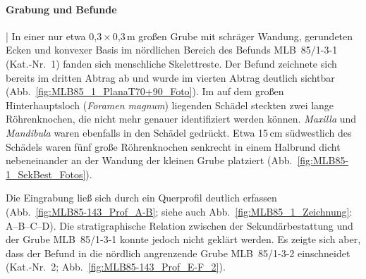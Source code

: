 \paragraph{Grabung und Befunde}\hspace{-.5em}|\hspace{.5em}%
In einer nur etwa 0,3\,$\times$\,0,3\,m großen Grube mit schräger Wandung, gerundeten Ecken und konvexer Basis im nördlichen Bereich des Befunds MLB~85/1-3-1 (Kat.-Nr.~1) fanden sich menschliche Skelettreste. Der Befund zeichnete sich bereits im dritten Abtrag ab und wurde im vierten Abtrag deutlich sichtbar (Abb.~\ref{fig:MLB85_1_PlanaT70+90_Foto}). Im auf dem großen Hinterhauptsloch (\textit{Foramen magnum}) liegenden Schädel steckten zwei lange Röhrenknochen, die nicht mehr genauer identifiziert werden können. \textit{Maxilla} und \textit{Mandibula} waren ebenfalls in den Schädel gedrückt. Etwa 15\,cm südwestlich des Schädels waren fünf große Röhrenknochen senkrecht in einem Halbrund dicht nebeneinander an der Wandung der kleinen Grube platziert (Abb.~\ref{fig:MLB85-1_SekBest_Fotos}).

Die Eingrabung ließ sich durch ein Querprofil deutlich erfassen (Abb.~\ref{fig:MLB85-143_Prof_A-B}; siehe auch Abb.~\ref{fig:MLB85_1_Zeichnung}: A--B--C--D). Die stratigraphische Relation zwischen der Sekundärbestattung und der Grube MLB~85/1-3-1 konnte jedoch nicht geklärt werden. Es zeigte sich aber, dass der Befund in die nördlich angrenzende Grube MLB~85/1-3-2 einschneidet (Kat.-Nr.~2; Abb.~\ref{fig:MLB85-143_Prof_E-F_2}).

